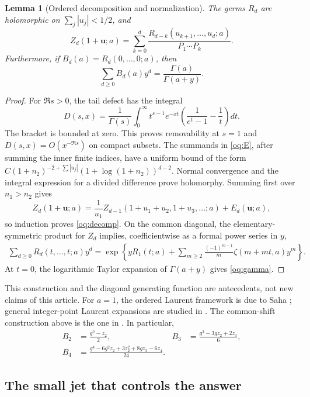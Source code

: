 \documentclass[11pt,a4paper]{article}
\numberwithin{equation}{section}
\newtheorem{lemma}[theorem]{Lemma}
\theoremstyle{definition}
\theoremstyle{remark}
\begin{document}
\begin{lemma}[Ordered decomposition and normalization]\label{oq:regular}
The germs $R_d$ are holomorphic on $\sum_j|u_j|<1/2$, and
\begin{equation}\label{oq:decomp}
 Z_d(1+\mathbf u;a)=
 \sum_{k=0}^d\frac{R_{d-k}(u_{k+1},\ldots,u_d;a)}{P_1\cdots P_k}.
\end{equation}
Furthermore, if $B_d(a)=R_d(0,\ldots,0;a)$, then
\begin{equation}\label{oq:gamma}
 \sum_{d\ge0}B_d(a)y^d=\frac{\Gamma(a)}{\Gamma(a+y)}.
\end{equation}
\end{lemma}
\begin{proof}
For $\Re s>0$, the tail defect has the integral
\[
 D(s,x)=\frac1{\Gamma(s)}\int_0^\infty
 t^{s-1}e^{-xt}\left(\frac1{e^t-1}-\frac1t\right)dt.
\]
The bracket is bounded at zero. This proves removability at $s=1$
and $D(s,x)=O(x^{-\Re s})$ on compact subsets. The summands in
\eqref{oq:E}, after summing the inner finite indices, have a
uniform bound of the form
$C(1+n_2)^{-2+\sum|u_j|}(1+\log(1+n_2))^{d-2}$.
Normal convergence and the integral expression for a divided difference
prove holomorphy. Summing first over $n_1>n_2$ gives
\[
 Z_d(1+\mathbf u;a)=\frac1{u_1}
 Z_{d-1}(1+u_1+u_2,1+u_3,\ldots;a)+E_d(\mathbf u;a),
\]
so induction proves \eqref{oq:decomp}. On the common diagonal,
the elementary-symmetric product for $Z_d$ implies, coefficientwise
as a formal power series in $y$,
\begin{align}\label{oq:diaggenerator}
 \sum_{d\ge0}R_d(t,\ldots,t;a)y^d
 =\exp\left\{yR_1(t;a)+
 \sum_{m\ge2}\frac{(-1)^{m-1}}m\zeta(m+mt,a)y^m\right\}.
\end{align}
At $t=0$, the logarithmic Taylor expansion of $\Gamma(a+y)$
gives \eqref{oq:gamma}.
\end{proof}

This construction and the diagonal generating function are antecedents,
not new claims of this article. For $a=1$, the ordered Laurent framework
is due to Saha \cite{Saha}; general integer-point Laurent expansions are
studied in \cite{MOW}. The common-shift construction above is the one
in \cite{RepoOrdered}. In particular,
\begin{align}
 B_2&=\frac{g^2-z_2}{2},&
 B_3&=\frac{g^3-3gz_2+2z_3}{6},\label{oq:B23}\\
 B_4&=\frac{g^4-6g^2z_2+3z_2^2+8gz_3-6z_4}{24}.
 \label{oq:B4}
\end{align}

\subsection{The small jet that controls the answer}
\end{document}

